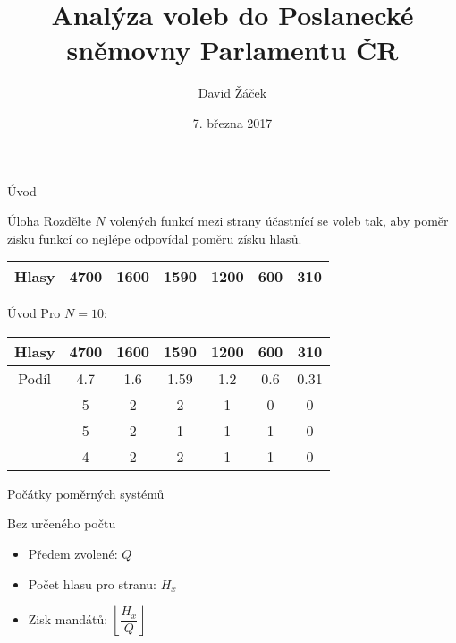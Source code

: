 \documentclass[17pt]{beamer}
\author{David Žáček}
\title[Volby do PSP ČR]{Analýza voleb do Poslanecké sněmovny Parlamentu ČR}
\institute{8.M}
\date{7. března 2017}
\begin{document}
\begin{frame}
\titlepage
\end{frame}


\begin{frame}{Úvod}
\center
\begin{block}{Úloha}
Rozdělte $N$ volených funkcí mezi strany účastnící se voleb tak, aby poměr zisku funkcí co nejlépe odpovídal poměru získu hlasů.
\end{block}
\bigskip
\begin{center}
\begin{tabular}{|c|c|c|c|c|c|c|}
\hline
Hlasy & 4700 & 1600 & 1590 & 1200 & 600 & 310  \\ \hline
\end{tabular}
\end{center}
\end{frame}

\begin{frame}{Úvod}
\center
Pro $N=10$:
\bigskip
\begin{center}
\begin{tabular}{|c|c|c|c|c|c|c|}
\hline
Hlasy & 4700 & 1600 & 1590 & 1200 & 600 & 310  \\ \hline
Podíl & 4.7  & 1.6  & 1.59 & 1.2  & 0.6 & 0.31 \\ \hline
      & 5    & 2    & 2    & 1    & 0   & 0    \\ \hline
      & 5    & 2    & 1    & 1    & 1   & 0    \\ \hline
      & 4    & 2    & 2    & 1    & 1   & 0    \\ \hline
\end{tabular}
\end{center}
\end{frame}

\begin{frame}{Počátky poměrných systémů}
\begin{center}
\end{center}
\end{frame}

\begin{frame}{Bez určeného počtu}
\begin{itemize}
\item Předem zvolené: $Q$
\item Počet hlasu pro stranu: $H_{x}$
\item Zisk mandátů: $\left\lfloor\dfrac{H_{x}}{Q}\right\rfloor$
\end{itemize}
\end{frame}
\end{document}
